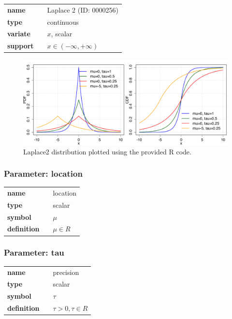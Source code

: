   \bigskip 

\begin{tabular}{p{2cm}cl}
\textbf{name} & & Laplace 2 (ID: 0000256)\\ 
 
\textbf{type} & & continuous \\ 

\textbf{variate} & & $x$, scalar \\ 

\textbf{support} & & $x \in (-\infty,+\infty)$
\end{tabular}

\begin{figure}[ht!]
\centering
  \includegraphics[width=140mm]{pics/Laplace2.pdf}
 \caption{Laplace2 distribution plotted using the provided R code.}
 \label{fig:Laplace2}
\end{figure}

\subsubsection*{Parameter: location}

\noindent\begin{tabular}{p{2cm}cl}
\textbf{name} & & location \\
\textbf{type} & & scalar \\
\textbf{symbol} & & $\mu$  \\
\textbf{definition} & & $\mu \in R$
\end{tabular}
\subsubsection*{Parameter: tau}

\noindent\begin{tabular}{p{2cm}cl}
\textbf{name} & & precision \\
\textbf{type} & & scalar \\
\textbf{symbol} & & $\tau$  \\
\textbf{definition} & & $\tau > 0, \tau \in R$
\end{tabular}
